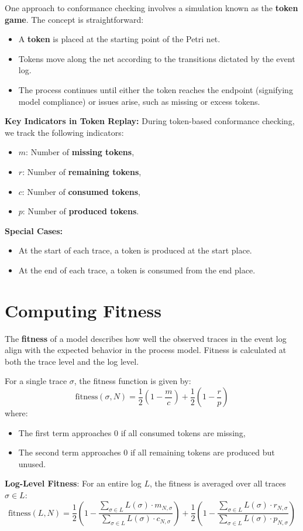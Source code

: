 One approach to conformance checking involves a simulation known as the \textbf{token game}. The concept is straightforward:
\begin{itemize}
    \item A \textbf{token} is placed at the starting point of the Petri net.
    \item Tokens move along the net according to the transitions dictated by the event log.
    \item The process continues until either the token reaches the endpoint (signifying model compliance) or issues arise, such as missing or excess tokens.
\end{itemize}
\textbf{Key Indicators in Token Replay:} During token-based conformance checking, we track the following indicators:
\begin{itemize}
    \item \( m \): Number of \textbf{missing tokens},
    \item \( r \): Number of \textbf{remaining tokens},
    \item \( c \): Number of \textbf{consumed tokens},
    \item \( p \): Number of \textbf{produced tokens}.
\end{itemize}
\textbf{Special Cases:}
\begin{itemize}
    \item At the start of each trace, a token is produced at the start place.
    \item At the end of each trace, a token is consumed from the end place.
\end{itemize}

\section{Computing Fitness}

The \textbf{fitness} of a model describes how well the observed traces in the event log align with the expected behavior in the process model. Fitness is calculated at both the trace level and the log level.

For a single trace \(\sigma\), the fitness function is given by:
\[
\text{fitness}(\sigma, N) = \frac{1}{2} \left(1 - \frac{m}{c} \right) + \frac{1}{2} \left(1 - \frac{r}{p} \right)
\]
where:
\begin{itemize}
    \item The first term approaches 0 if all consumed tokens are missing,
    \item The second term approaches 0 if all remaining tokens are produced but unused.
\end{itemize}
\textbf{Log-Level Fitness}: For an entire log \(L\), the fitness is averaged over all traces \(\sigma \in L\):
\[
\text{fitness}(L, N) = \frac{1}{2} 
\left(1 - \frac{\sum_{\sigma \in L} L(\sigma) \cdot m_{N,\sigma}}{\sum_{\sigma \in L} L(\sigma) \cdot c_{N,\sigma}} \right) + \frac{1}{2} \left(1 - \frac{\sum_{\sigma \in L} L(\sigma) \cdot  r_{N,\sigma}}{\sum_{\sigma \in L} L(\sigma) \cdot  p_{N,\sigma}} \right)
\]

